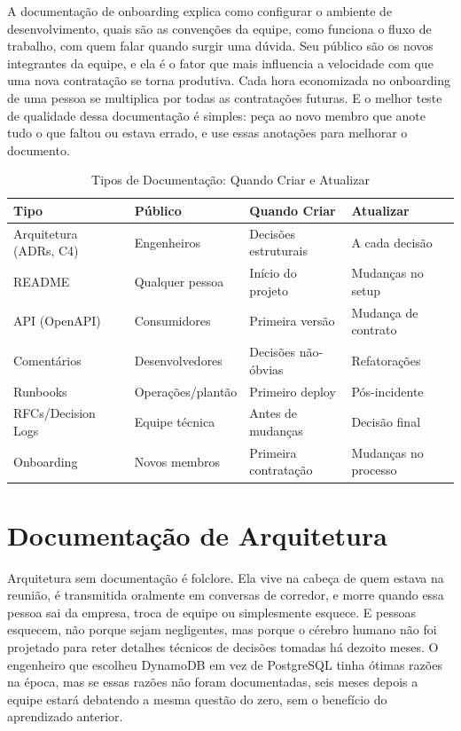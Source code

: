 A documentação de onboarding explica como configurar o ambiente de
desenvolvimento, quais são as convenções da equipe, como funciona o
fluxo de trabalho, com quem falar quando surgir uma dúvida. Seu
público são os novos integrantes da equipe, e ela é o fator que mais
influencia a velocidade com que uma nova contratação se torna produtiva.
Cada hora economizada no onboarding de uma pessoa se multiplica por
todas as contratações futuras. E o melhor teste de qualidade dessa
documentação é simples: peça ao novo membro que anote tudo o que faltou
ou estava errado, e use essas anotações para melhorar o documento.

\begin{table}[ht]
\centering
\caption{Tipos de Documentação: Quando Criar e Atualizar}
\begin{tabular}{@{}p{3.5cm}p{3.5cm}p{3cm}p{3cm}@{}}
\toprule
\textbf{Tipo} & \textbf{Público} & \textbf{Quando Criar} & \textbf{Atualizar} \\
\midrule
Arquitetura (ADRs, C4) & Engenheiros & Decisões estruturais & A cada decisão \\
README & Qualquer pessoa & Início do projeto & Mudanças no setup \\
API (OpenAPI) & Consumidores & Primeira versão & Mudança de contrato \\
Comentários & Desenvolvedores & Decisões não-óbvias & Refatorações \\
Runbooks & Operações/plantão & Primeiro deploy & Pós-incidente \\
RFCs/Decision Logs & Equipe técnica & Antes de mudanças & Decisão final \\
Onboarding & Novos membros & Primeira contratação & Mudanças no processo \\
\bottomrule
\end{tabular}
\end{table}


\section{Documentação de Arquitetura}

Arquitetura sem documentação é folclore. Ela vive na cabeça de quem estava
na reunião, é transmitida oralmente em conversas de corredor, e morre
quando essa pessoa sai da empresa, troca de equipe ou simplesmente
esquece. E pessoas esquecem, não porque sejam negligentes, mas porque
o cérebro humano não foi projetado para reter detalhes técnicos de
decisões tomadas há dezoito meses. O engenheiro que escolheu DynamoDB
em vez de PostgreSQL tinha ótimas razões na época, mas se essas razões
não foram documentadas, seis meses depois a equipe estará debatendo a
mesma questão do zero, sem o benefício do aprendizado anterior.

